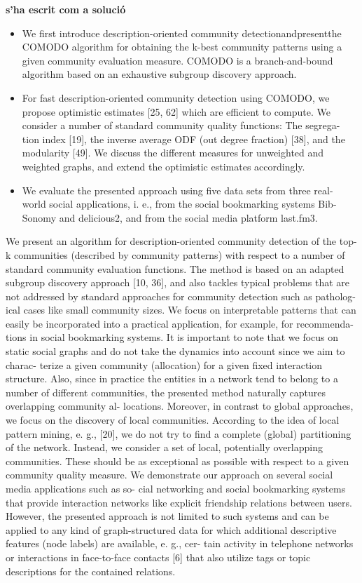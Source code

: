 \documentclass[a4paper]{article}
\begin{document}
{\bf s'ha escrit com a solució} 
\begin{itemize}
	\item We first introduce description-oriented community detectionandpresentthe COMODO algorithm for obtaining the k-best community patterns using a given community evaluation measure. COMODO is a branch-and-bound algorithm based on an exhaustive subgroup discovery approach.
	\item For fast description-oriented community detection using COMODO, we propose optimistic estimates [25, 62] which are efficient to compute. We consider a number of standard community quality functions: The segrega- tion index [19], the inverse average ODF (out degree fraction) [38], and the modularity [49]. We discuss the different measures for unweighted and weighted graphs, and extend the optimistic estimates accordingly.
	\item We evaluate the presented approach using five data sets from three real- world social applications, i. e., from the social bookmarking systems Bib- Sonomy and delicious2, and from the social media platform last.fm3.
\end{itemize}

We present an algorithm for description-oriented community detection of the top-k communities (described by community patterns) with respect to a number of standard community evaluation functions. The method is based on an adapted subgroup discovery approach [10, 36], and also tackles typical problems that are not addressed by standard approaches for community detection such as patholog- ical cases like small community sizes. We focus on interpretable patterns that can easily be incorporated into a practical application, for example, for recommenda- tions in social bookmarking systems. It is important to note that we focus on static social graphs and do not take the dynamics into account since we aim to charac- terize a given community (allocation) for a given fixed interaction structure. Also, since in practice the entities in a network tend to belong to a number of different communities, the presented method naturally captures overlapping community al- locations. Moreover, in contrast to global approaches, we focus on the discovery of local communities. According to the idea of local pattern mining, e. g., [20], we do not try to find a complete (global) partitioning of the network. Instead, we consider a set of local, potentially overlapping communities. These should be as exceptional as possible with respect to a given community quality measure.
We demonstrate our approach on several social media applications such as so- cial networking and social bookmarking systems that provide interaction networks like explicit friendship relations between users. However, the presented approach is not limited to such systems and can be applied to any kind of graph-structured data for which additional descriptive features (node labels) are available, e. g., cer- tain activity in telephone networks or interactions in face-to-face contacts [6] that also utilize tags or topic descriptions for the contained relations.
\end{document}
